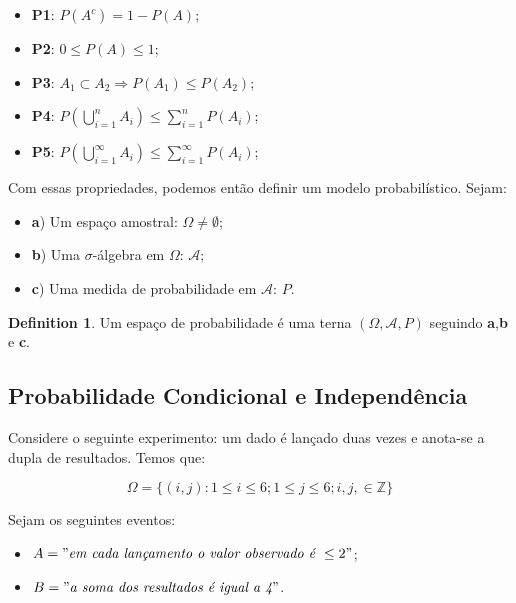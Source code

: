 \documentclass[
]{article}
\providecommand{\tightlist}{%
  \setlength{\itemsep}{0pt}\setlength{\parskip}{0pt}}
\theoremstyle{definition}
\newtheorem{definition}{Definition}[section]
\theoremstyle{definition}
\theoremstyle{definition}
\theoremstyle{definition}
\theoremstyle{remark}
\begin{document}
\begin{itemize}
\tightlist
\item
  \textbf{P1}: \(P(A^{c}) = 1 - P(A)\);
\item
  \textbf{P2}: \(0 \le P(A) \le 1\);
\item
  \textbf{P3}: \(A_{1} \subset A_{2} \Rightarrow P(A_{1}) \le P(A_{2})\);
\item
  \textbf{P4}: \(P(\bigcup_{i=1}^{n}A_{i}) \le \sum_{i=1}^{n}P(A_{i})\);
\item
  \textbf{P5}: \(P(\bigcup_{i=1}^{\infty}A_{i}) \le \sum_{i=1}^{\infty}P(A_{i})\);
\end{itemize}

Com essas propriedades, podemos então definir um modelo probabilístico. Sejam:

\begin{itemize}
\tightlist
\item
  \textbf{a}) Um espaço amostral: \(\Omega \neq \emptyset\);
\item
  \textbf{b}) Uma \(\sigma\)-álgebra em \(\Omega\): \(\mathcal{A}\);
\item
  \textbf{c}) Uma medida de probabilidade em \(\mathcal{A}\): \(P\).
\end{itemize}

\begin{definition}
Um espaço de probabilidade é uma terna \((\Omega,\mathcal{A},P)\) seguindo \textbf{a},\textbf{b} e \textbf{c}.
\end{definition}

\hypertarget{probabilidade-condicional-e-independuxeancia}{%
\subsection{Probabilidade Condicional e Independência}\label{probabilidade-condicional-e-independuxeancia}}

Considere o seguinte experimento: um dado é lançado duas vezes e anota-se a dupla de resultados. Temos que:

\begin{equation*}
\Omega = \{(i,j) : 1 \le i \le 6; 1 \le j \le 6; i,j, \in \mathbb{Z}\}
\end{equation*}

Sejam os seguintes eventos:

\begin{itemize}
\tightlist
\item
  \(A = "\textit{em cada lançamento o valor observado é } \le 2"\);
\item
  \(B = "\textit{a soma dos resultados é igual a 4}"\).
\end{itemize}
\end{document}
